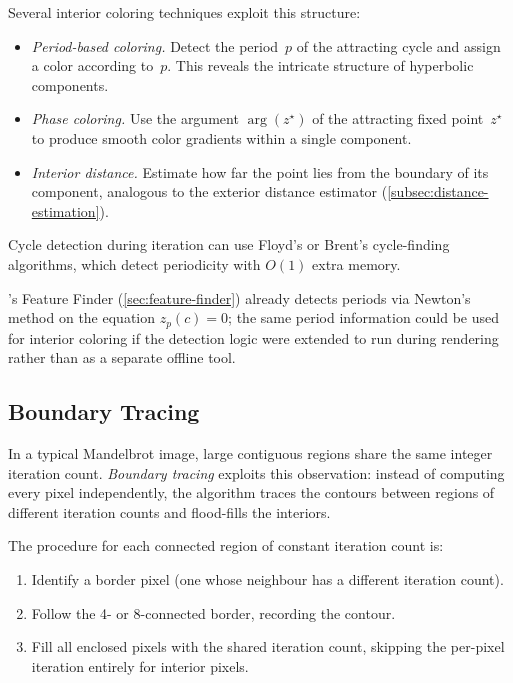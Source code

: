 Several interior coloring techniques exploit this structure:
\begin{itemize}
  \item \emph{Period-based coloring.}  Detect the period~$p$ of the
        attracting cycle and assign a color according to~$p$.  This
        reveals the intricate structure of hyperbolic components.
  \item \emph{Phase coloring.}  Use the argument
        $\arg(z^\star)$ of the attracting fixed point~$z^\star$ to
        produce smooth color gradients within a single component.
  \item \emph{Interior distance.}  Estimate how far the point lies from
        the boundary of its component, analogous to the exterior
        distance estimator (\cref{subsec:distance-estimation}).
\end{itemize}

Cycle detection during iteration can use Floyd's or Brent's
cycle-finding algorithms, which detect periodicity with $O(1)$ extra
memory.

\FractalShark{}'s Feature Finder (\cref{sec:feature-finder}) already
detects periods via Newton's method on the equation $z_p(c) = 0$; the
same period information could be used for interior coloring if the
detection logic were extended to run during rendering rather than as a
separate offline tool.

\subsection{Boundary Tracing}
\label{subsec:boundary-tracing}

In a typical Mandelbrot image, large contiguous regions share the same
integer iteration count.  \emph{Boundary tracing} exploits this
observation: instead of computing every pixel independently, the
algorithm traces the contours between regions of different iteration
counts and flood-fills the interiors.

The procedure for each connected region of constant iteration count is:
\begin{enumerate}
  \item Identify a border pixel (one whose neighbour has a different
        iteration count).
  \item Follow the 4- or 8-connected border, recording the contour.
  \item Fill all enclosed pixels with the shared iteration count,
        skipping the per-pixel iteration entirely for interior pixels.
\end{enumerate}

